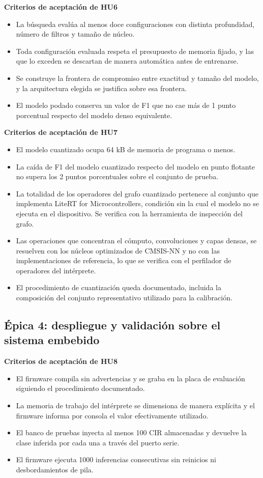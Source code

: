 \documentclass[
11pt, %
]{charter}
\begin{document}
\textbf{Criterios de aceptación de HU6}
\begin{itemize}
    \item La búsqueda evalúa al menos doce configuraciones con distinta profundidad, número de filtros y tamaño de núcleo.
    \item Toda configuración evaluada respeta el presupuesto de memoria fijado, y las que lo exceden se descartan de manera automática antes de entrenarse.
    \item Se construye la frontera de compromiso entre exactitud y tamaño del modelo, y la arquitectura elegida se justifica sobre esa frontera.
    \item El modelo podado conserva un valor de F1 que no cae más de 1 punto porcentual respecto del modelo denso equivalente.
\end{itemize}

\textbf{Criterios de aceptación de HU7}
\begin{itemize}
    \item El modelo cuantizado ocupa 64 kB de memoria de programa o menos.
    \item La caída de F1 del modelo cuantizado respecto del modelo en punto flotante no supera los 2 puntos porcentuales sobre el conjunto de prueba.
    \item La totalidad de los operadores del grafo cuantizado pertenece al conjunto que implementa LiteRT for Microcontrollers, condición sin la cual el modelo no se ejecuta en el dispositivo. Se verifica con la herramienta de inspección del grafo.
    \item Las operaciones que concentran el cómputo, convoluciones y capas densas, se resuelven con los núcleos optimizados de CMSIS-NN y no con las implementaciones de referencia, lo que se verifica con el perfilador de operadores del intérprete.
    \item El procedimiento de cuantización queda documentado, incluida la composición del conjunto representativo utilizado para la calibración.
\end{itemize}

\subsection{Épica 4: despliegue y validación sobre el sistema embebido}

\textbf{Criterios de aceptación de HU8}
\begin{itemize}
    \item El firmware compila sin advertencias y se graba en la placa de evaluación siguiendo el procedimiento documentado.
    \item La memoria de trabajo del intérprete se dimensiona de manera explícita y el firmware informa por consola el valor efectivamente utilizado.
    \item El banco de pruebas inyecta al menos 100 CIR almacenadas y devuelve la clase inferida por cada una a través del puerto serie.
    \item El firmware ejecuta 1000 inferencias consecutivas sin reinicios ni desbordamientos de pila.
\end{itemize}
\end{document}
